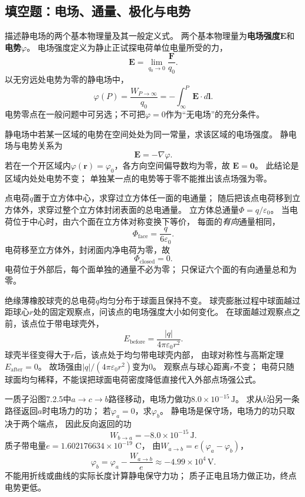 \subsection{填空题：电场、通量、极化与电势}

\problemtext 描述静电场的两个基本物理量及其一般定义式。
\workings
两个基本物理量为\textbf{电场强度$\bm E$}和\textbf{电势$\varphi$}。
电场强度定义为静止正试探电荷单位电量所受的力，
\[
\boxed{\bm E=\lim_{q_0\to0}\frac{\bm F}{q_0}}.
\]
以无穷远处电势为零的静电场中，
\[
\boxed{\varphi(P)=\frac{W_{P\to\infty}}{q_0}
=-\int_\infty^P\bm E\cdot d\bm l}.
\]
\crosscheck 电势零点在一般问题中可另选；不可把$\varphi=0$作为“无电场”的充分条件。

\problemtext 静电场中若某一区域的电势在空间处处为同一常量，求该区域的电场强度。
\workings
静电场与电势关系为
\[
\boxed{\bm E=-\nabla\varphi}.
\]
若在一个开区域内$\varphi(\bm r)=\varphi_0$，各方向空间偏导数均为零，故
$\boxed{\bm E=\bm0}$。
\crosscheck 此结论是区域内处处电势不变；
单独某一点的电势等于零不能推出该点场强为零。

\problemtext 点电荷$q$置于立方体中心，求穿过立方体任一面的电通量；
随后把该点电荷移到立方体外，求穿过整个立方体封闭表面的总电通量。
\workings
立方体总通量$\Phi=q/\varepsilon_0$。
当电荷位于中心时，由六个面在立方体对称变换下等价，
每面的\emph{有向}通量相同，
\[
\boxed{\Phi_{\mathrm{face}}=\frac{q}{6\varepsilon_0}}.
\]
电荷移至立方体外，封闭面内净电荷为零，故
\[
\boxed{\Phi_{\mathrm{closed}}=0}.
\]
\crosscheck 电荷位于外部后，每个面单独的通量不必为零；
只保证六个面的有向通量总和为零。

\problemtext 绝缘薄橡胶球壳的总电荷$q$均匀分布于球面且保持不变。
球壳膨胀过程中球面越过距球心$r$处的固定观察点，问该点的电场强度大小如何变化。
\workings
在球面越过观察点之前，该点位于带电球壳外，
\[
E_{\mathrm{before}}=\frac{|q|}{4\pi\varepsilon_0r^2}.
\]
球壳半径变得大于$r$后，该点处于均匀带电球壳内部，
由球对称性与高斯定理
$\boxed{E_{\mathrm{after}}=0}$。
故场强由$\boxed{|q|/(4\pi\varepsilon_0r^2)}$变为$\boxed{0}$。
\crosscheck 观察点与球心距离$r$不变；
电荷只随球面均匀稀释，不能误把球面电荷密度降低直接代入外部点场强公式。

\problemtext 一质子沿图7.2.5中$a\to c\to b$路径移动，电场力做功$8.0\times10^{-15}\,\mathrm J$。
求从$b$沿另一条路径返回$a$时电场力的功；
若$\varphi_a=0$，求$\varphi_b$。
\workings
静电场是保守场，电场力的功只取决于两个端点，
因此反向返回的功
\[
\boxed{W_{b\to a}=-8.0\times10^{-15}\,\mathrm J}.
\]
质子带电量$e=1.602176634\times10^{-19}$ C，
由$W_{a\to b}=e(\varphi_a-\varphi_b)$，
\[
\boxed{\varphi_b=\varphi_a-\frac{W_{a\to b}}e
\approx-4.99\times10^4\,\mathrm V}.
\]
\crosscheck 不能用折线或曲线的实际长度计算静电保守力功；
质子正电且场力做正功，终点电势更低。

